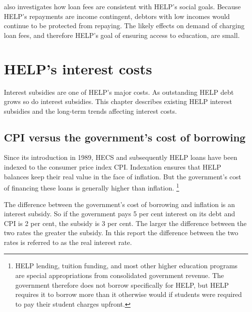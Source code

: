 \documentclass[embargoed]{grattan}
\begin{document}
 also investigates how loan fees are consistent with \gls{HELP}'s social goals.
Because \gls{HELP}'s repayments are income contingent, debtors with low incomes would continue to be protected from repaying.
The likely effects on demand of charging loan fees, and therefore \gls{HELP}'s goal of ensuring access to education, are small.

\chapter[HELP's interest costs]{\gls{HELP}'s interest costs}\label{chap:2-helps-interest-costs}

Interest subsidies are one of \gls{HELP}'s major costs.
As outstanding \gls{HELP} debt grows so do interest subsidies.
This chapter describes existing \gls{HELP} interest subsidies and the long-term trends affecting interest costs.

\section[CPI versus the government's cost of borrowing]{\gls{CPI} versus the government's cost of borrowing}\label{sec:cpi-versus-the-governments-cost-of-borrowing}

Since its introduction in 1989, \gls{HECS} and subsequently \gls{HELP} loans have been indexed to the consumer price index \gls{CPI}.
Indexation ensures that \gls{HELP} balances keep their real value in the face of inflation.
But the government's cost of financing these loans is generally higher than inflation.%
\footnote{HELP lending, tuition funding, and most other higher education programs are special appropriations from consolidated government revenue.
The government therefore does not borrow specifically for \gls{HELP}, but \gls{HELP} requires it to borrow more than it otherwise would if students were required to pay their student charges upfront.}

The difference between the government's cost of borrowing and inflation is an interest subsidy.
So if the government pays 5 per cent interest on its debt and \gls{CPI} is 2 per cent, the subsidy is 3 per cent.
The larger the difference between the two rates the greater the subsidy.
In this report the difference between the two rates is referred to as the real interest rate.
\end{document}
